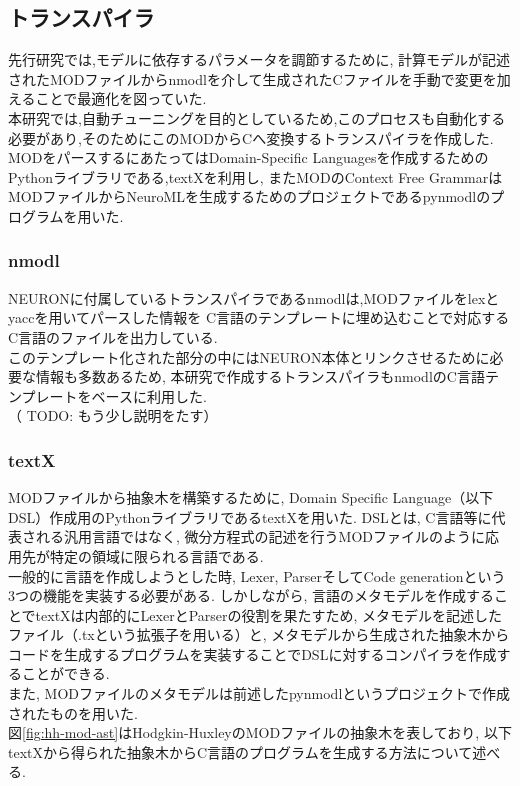 \subsection{トランスパイラ}
先行研究\cite{miyamoto-master}では,モデルに依存するパラメータを調節するために,
計算モデルが記述されたMODファイルからnmodlを介して生成されたCファイルを手動で変更を加えることで最適化を図っていた.\\
本研究では,自動チューニングを目的としているため,このプロセスも自動化する必要があり,そのためにこのMODからCへ変換するトランスパイラを作成した.\\
MODをパースするにあたってはDomain-Specific Languagesを作成するためのPythonライブラリである,textX\cite{textX-repo}を利用し,
またMODのContext Free GrammarはMODファイルからNeuroMLを生成するためのプロジェクトであるpynmodl\cite{pynmodl-repo}のプログラムを用いた.\\

\subsubsection{nmodl}
NEURONに付属しているトランスパイラであるnmodlは,MODファイルをlexとyacc\cite{lex}を用いてパースした情報を
C言語のテンプレートに埋め込むことで対応するC言語のファイルを出力している.\\
このテンプレート化された部分の中にはNEURON本体とリンクさせるために必要な情報も多数あるため,
本研究で作成するトランスパイラもnmodlのC言語テンプレートをベースに利用した.\\
（ TODO: もう少し説明をたす）

\subsubsection{textX}
MODファイルから抽象木を構築するために, Domain Specific Language（以下DSL）作成用のPythonライブラリであるtextX\cite{textX}を用いた.
DSLとは, C言語等に代表される汎用言語ではなく, 微分方程式の記述を行うMODファイルのように応用先が特定の領域に限られる言語である.\\
一般的に言語を作成しようとした時, Lexer, ParserそしてCode generationという3つの機能を実装する必要がある.
しかしながら, 言語のメタモデルを作成することでtextXは内部的にLexerとParserの役割を果たすため,
メタモデルを記述したファイル（.txという拡張子を用いる）と, メタモデルから生成された抽象木からコードを生成するプログラムを実装することでDSLに対するコンパイラを作成することができる.\\
また, MODファイルのメタモデルは前述したpynmodlというプロジェクトで作成されたものを用いた.\\
図\ref{fig:hh-mod-ast}はHodgkin-HuxleyのMODファイルの抽象木を表しており, 以下textXから得られた抽象木からC言語のプログラムを生成する方法について述べる.\\

